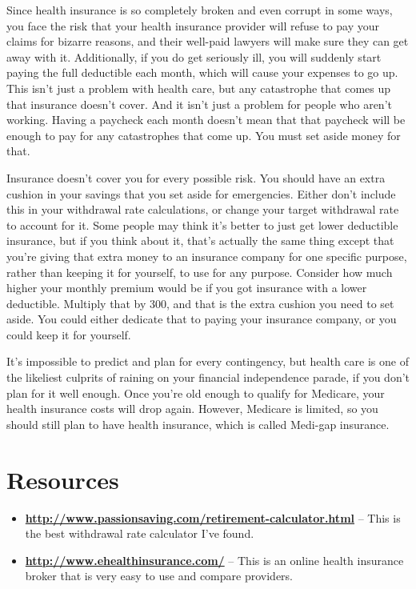 Since health insurance is so completely broken and even corrupt in some ways, you face the risk that your health insurance provider will refuse to pay your claims for bizarre reasons, and their well-paid lawyers will make sure they can get away with it. Additionally, if you do get seriously ill, you will suddenly start paying the full deductible each month, which will cause your expenses to go up. This isn't just a problem with health care, but any catastrophe that comes up that insurance doesn't cover. And it isn't just a problem for people who aren't working. Having a paycheck each month doesn't mean that that paycheck will be enough to pay for any catastrophes that come up. You must set aside money for that.

Insurance doesn't cover you for every possible risk. You should have an extra cushion in your savings that you set aside for emergencies. Either don't include this in your withdrawal rate calculations, or change your target withdrawal rate to account for it. Some people may think it's better to just get lower deductible insurance, but if you think about it, that's actually the same thing except that you're giving that extra money to an insurance company for one specific purpose, rather than keeping it for yourself, to use for any purpose. Consider how much higher your monthly premium would be if you got insurance with a lower deductible. Multiply that by 300, and that is the extra cushion you need to set aside. You could either dedicate that to paying your insurance company, or you could keep it for yourself.

It's impossible to predict and plan for every contingency, but health care is one of the likeliest culprits of raining on your financial independence parade, if you don't plan for it well enough. Once you're old enough to qualify for Medicare, your health insurance costs will drop again. However, Medicare is limited, so you should still plan to have health insurance, which is called Medi-gap insurance.

\newpage
\section{Resources}
\begin{itemize}
\item \textbf{\url{http://www.passionsaving.com/retirement-calculator.html}} -- This is the best withdrawal rate calculator I've found.

\item \textbf{\url{http://www.ehealthinsurance.com/}} -- This is an online health insurance broker that is very easy to use and compare providers. 
\end{itemize}
